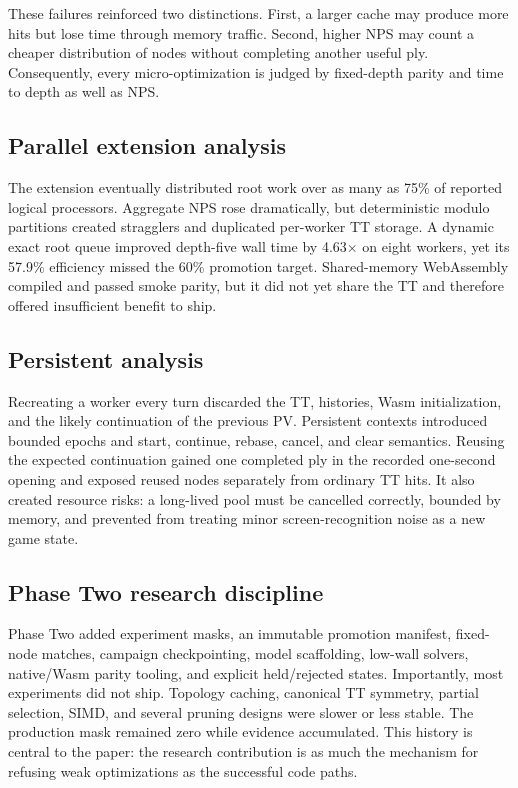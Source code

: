 These failures reinforced two distinctions. First, a larger cache may produce more hits but lose time through memory traffic. Second, higher NPS may count a cheaper distribution of nodes without completing another useful ply. Consequently, every micro-optimization is judged by fixed-depth parity and time to depth as well as NPS.

\subsection{Parallel extension analysis}
The extension eventually distributed root work over as many as 75\% of reported logical processors. Aggregate NPS rose dramatically, but deterministic modulo partitions created stragglers and duplicated per-worker TT storage. A dynamic exact root queue improved depth-five wall time by 4.63$\times$ on eight workers, yet its 57.9\% efficiency missed the 60\% promotion target. Shared-memory WebAssembly compiled and passed smoke parity, but it did not yet share the TT and therefore offered insufficient benefit to ship.

\subsection{Persistent analysis}
Recreating a worker every turn discarded the TT, histories, Wasm initialization, and the likely continuation of the previous PV. Persistent contexts introduced bounded epochs and start, continue, rebase, cancel, and clear semantics. Reusing the expected continuation gained one completed ply in the recorded one-second opening and exposed reused nodes separately from ordinary TT hits. It also created resource risks: a long-lived pool must be cancelled correctly, bounded by memory, and prevented from treating minor screen-recognition noise as a new game state.

\subsection{Phase Two research discipline}
Phase Two added experiment masks, an immutable promotion manifest, fixed-node matches, campaign checkpointing, model scaffolding, low-wall solvers, native/Wasm parity tooling, and explicit held/rejected states. Importantly, most experiments did not ship. Topology caching, canonical TT symmetry, partial selection, SIMD, and several pruning designs were slower or less stable. The production mask remained zero while evidence accumulated. This history is central to the paper: the research contribution is as much the mechanism for refusing weak optimizations as the successful code paths.
